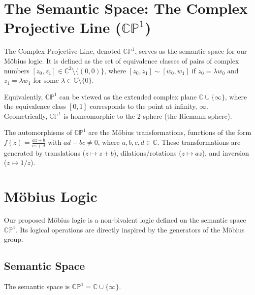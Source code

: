 














	\section{The Semantic Space: The Complex Projective Line ($\mathbb{CP}^1$)}

	The Complex Projective Line, denoted $\mathbb{CP}^1$, serves as the semantic space for our Möbius logic. It is defined as the set of equivalence classes of pairs of complex numbers $[z_0, z_1] \in \mathbb{C}^2 \setminus \{(0,0)\}$, where $[z_0, z_1] \sim [w_0, w_1]$ if $z_0 = \lambda w_0$ and $z_1 = \lambda w_1$ for some $\lambda \in \mathbb{C} \setminus \{0\}$.

	Equivalently, $\mathbb{CP}^1$ can be viewed as the extended complex plane $\mathbb{C} \cup \{\infty\}$, where the equivalence class $[0, 1]$ corresponds to the point at infinity, $\infty$. Geometrically, $\mathbb{CP}^1$ is homeomorphic to the 2-sphere (the Riemann sphere).

	The automorphisms of $\mathbb{CP}^1$ are the M\"{o}bius transformations, functions of the form $f(z) = \frac{az+b}{cz+d}$ with $ad-bc \neq 0$, where $a, b, c, d \in \mathbb{C}$. These transformations are generated by translations ($z \mapsto z+b$), dilations/rotations ($z \mapsto az$), and inversion ($z \mapsto 1/z$).

	\section{Möbius Logic}

	Our proposed M\"{o}bius logic is a non-bivalent logic defined on the semantic space $\mathbb{CP}^1$. Its logical operations are directly inspired by the generators of the M\"{o}bius group.

	\subsection{Semantic Space}
	The semantic space is $\mathbb{CP}^1 = \mathbb{C} \cup \{\infty\}$.

